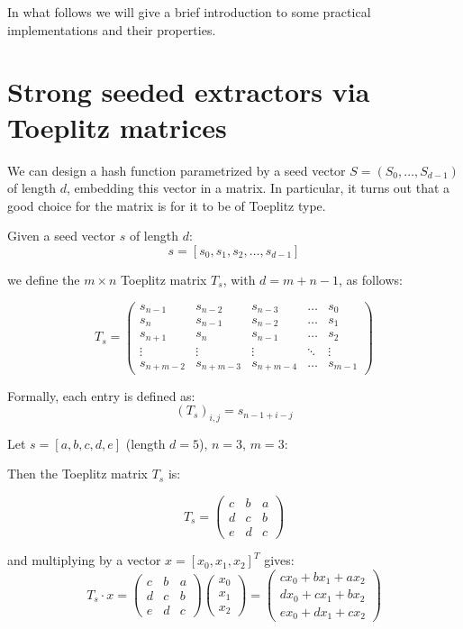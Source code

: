 In what follows we will give a brief introduction to some practical implementations and their properties.

\section{Strong seeded extractors via Toeplitz matrices}

We can design a hash function parametrized by a seed vector $S = (S_0, \dots, S_{d-1})$ of length $d$, embedding this vector in a matrix. In particular, it turns out that a good choice for the matrix is for it to be of Toeplitz type. 

\begin{definition}

Given a seed vector \( s \) of length \( d \):
\[
s = [s_0, s_1, s_2, \dots, s_{d-1}]
\]

we define the \( m \times n \) Toeplitz matrix \( T_s \), with \( d = m + n - 1 \), as follows:

\[
T_s =
\begin{pmatrix}
s_{n-1} & s_{n-2} & s_{n-3} & \dots & s_0 \\
s_{n} & s_{n-1} & s_{n-2} & \dots & s_{1} \\
s_{n+1} & s_{n} & s_{n-1} & \dots & s_{2} \\
\vdots & \vdots & \vdots & \ddots & \vdots \\
s_{n+m-2} & s_{n+m-3} & s_{n+m-4} & \dots & s_{m-1}
\end{pmatrix}
\]

Formally, each entry is defined as:
\[
(T_s)_{i,j} = s_{n - 1 + i - j}
\]
\end{definition}

\begin{example}

Let \( s = [a,b,c,d,e] \) (length \( d = 5 \)), \( n = 3 \), \( m = 3 \):

Then the Toeplitz matrix \(T_s\) is:

\[
T_s =
\begin{pmatrix}
c & b & a \\
d & c & b \\
e & d & c
\end{pmatrix}
\]

and multiplying by a vector \( x = [x_0, x_1, x_2]^T \) gives:
\[
T_s \cdot x =
\begin{pmatrix}
c & b & a \\
d & c & b \\
e & d & c
\end{pmatrix}
\begin{pmatrix}
x_0 \\ x_1 \\ x_2
\end{pmatrix}
=
\begin{pmatrix}
c x_0 + b x_1 + a x_2 \\
d x_0 + c x_1 + b x_2 \\
e x_0 + d x_1 + c x_2
\end{pmatrix}
\]

\end{example}

